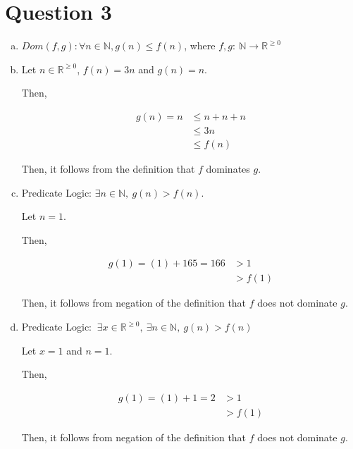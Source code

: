 \documentclass[12pt]{article}
\begin{document}
\section*{Question 3}
\begin{enumerate}[a.]
    \item

    $Dom(f,g):\forall n \in \mathbb{N}, g(n) \leq f(n)$, where $f,g:\:\mathbb{N} \to \mathbb{R}^{\geq0}$

    \item

    Let $n \in \mathbb{R}^{\geq0}$, $f(n) = 3n$ and $g(n) = n$.

    \bigskip

    Then,

    \begin{align}
        g(n) = n &\leq n + n + n\\
        &\leq 3n\\
        &\leq f(n)
    \end{align}

    \bigskip

    Then, it follows from the definition that $f$ dominates $g$.

    \item

    Predicate Logic: $\exists n \in \mathbb{N},\:g(n) > f(n)$.

    \bigskip

    Let $n = 1$.

    \bigskip

    Then,


    \begin{align}
        g(1) = (1) + 165 = 166 &> 1\\
        &> f(1)
    \end{align}

    \bigskip

    Then, it follows from negation of the definition that $f$ does not dominate $g$.

    \item

    Predicate Logic: $\:\exists x \in \mathbb{R}^{\geq 0},\:\exists n \in \mathbb{N},\:g(n) > f(n)$

    \bigskip

    Let $x = 1$ and $n = 1$.

    \bigskip

    Then,

    \begin{align}
        g(1) = (1) + 1 = 2 &> 1\\
        &> f(1)
    \end{align}

    \bigskip

    Then, it follows from negation of the definition that $f$ does not dominate $g$.


\end{enumerate}
\end{document}
